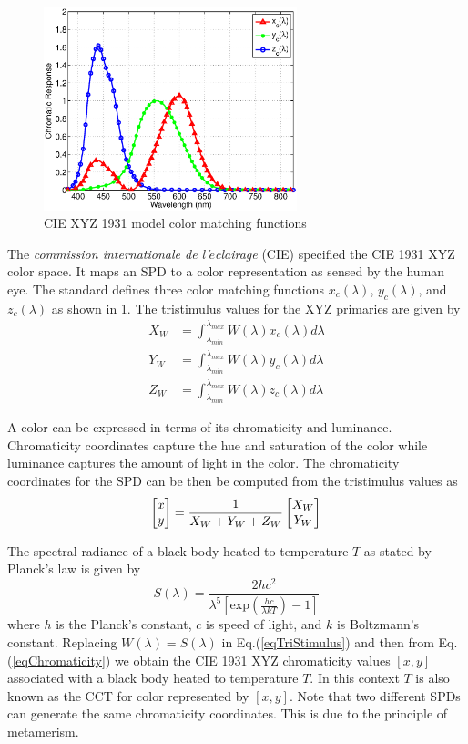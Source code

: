 \begin{figure}[!b]
	\centering
		\includegraphics[trim={0.05in 0.05in 0.05in 0.05in}, clip=true, width=2.9in]{img/CIE1931CMF.eps}
	\caption{CIE XYZ 1931 model color matching functions}
	\label{fig:CIE1931CMF}
\end{figure}

The \textit{commission internationale de l'$\acute{e}$clairage} (CIE) specified the CIE 1931 XYZ color space. It maps an SPD to a color representation as sensed by the human eye. The standard defines three color matching functions $x_c(\lambda)$, $y_c(\lambda)$, and $z_c(\lambda)$ as shown in \figurename{ \ref{fig:CIE1931CMF}}. The tristimulus values for the XYZ primaries are given by
\setlength{\arraycolsep}{0.0em}
\begin{subequations}
\begin{align}
X_W &= \int_{\lambda_{min}}^{\lambda_{max}}W(\lambda)x_c(\lambda)d\lambda\\
Y_W &= \int_{\lambda_{min}}^{\lambda_{max}}W(\lambda)y_c(\lambda)d\lambda\\
Z_W &= \int_{\lambda_{min}}^{\lambda_{max}}W(\lambda)z_c(\lambda)d\lambda
\end{align}
\label{eqTriStimulus}
\end{subequations}
\setlength{\arraycolsep}{5pt}

A color can be expressed in terms of its chromaticity and luminance. Chromaticity coordinates capture the hue and saturation of the color while luminance captures the amount of light in the color. The chromaticity coordinates for the SPD can be then be computed from the tristimulus values as
\begin{equation}
\label{eqChromaticity}
	\left[ \begin{matrix} x\\ y \end{matrix} \right] = \frac{1}{X_W+Y_W+Z_W}\left[ \begin{matrix} X_W\\ Y_W \end{matrix} \right]
\end{equation}

The spectral radiance of a black body heated to temperature $T$ as stated by Planck's law is given by
\begin{equation}
\label{eqPlanck}
	 S(\lambda) = \frac{2hc^2}{\lambda^5\left[\text{exp}\left(\frac{hc}{\lambda kT}\right)-1\right]}
\end{equation}
where $h$ is the Planck's constant, $c$ is speed of light, and $k$ is Boltzmann's constant. Replacing $W(\lambda)=S(\lambda)$ in Eq.(\ref{eqTriStimulus}) and then from Eq.(\ref{eqChromaticity}) we obtain the CIE 1931 XYZ chromaticity values $[x,y]$ associated with a black body heated to temperature $T$. In this context $T$ is also known as the CCT for color represented by $[x,y]$. Note that two different SPDs can generate the same chromaticity coordinates. This is due to the principle of metamerism.

